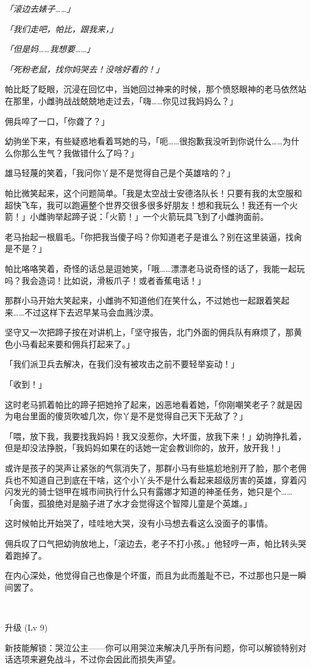 \emph{「滚边去婊子……」}

\emph{「我们走吧，帕比，跟我来，」}

\emph{「但是妈……我想要……」}

\emph{「死粉老鼠，找你妈哭去！没啥好看的！」}

帕比眨了眨眼，沉浸在回忆中，当她回过神来的时候，那个愤怒眼神的老马依然站在那里，小雌驹战战兢兢地走过去，「嗨……你见过我妈妈么？」

佣兵啐了一口，「你聋了？」

幼驹坐下来，有些疑惑地看着骂她的马，「呃……很抱歉我没听到你说什么……为什么你那么生气？我做错什么了吗？」

雄马轻蔑的笑着，「我问你丫是不是觉得自己是个英雄啥的？」

帕比微笑起来，这个问题简单。「我是太空战士安德洛队长！只要有我的太空服和超快飞车，我可以跑遍整个世界交很多很多好朋友！想和我玩么！我还有一个火箭！」小雌驹举起蹄子说：「火箭！」一个火箭玩具飞到了小雌驹面前。

老马抬起一根眉毛。「你把我当傻子吗？你知道老子是谁么？别在这里装逼，找肏是不是？」

帕比咯咯笑着，奇怪的话总是逗她笑，「哦……漂漂老马说奇怪的话了，我能一起玩吗？我会造词！比如说，滑板爪子！或者香蕉电话！」

那群小马开始大笑起来，小雌驹不知道他们在笑什么，不过她也一起跟着笑起来……不过这样下去迟早某马会血溅沙漠。

坚守又一次把蹄子按在对讲机上，「坚守报告，北门外面的佣兵队有麻烦了，那黄色小马看起来要和佣兵打起来了。」

「我们派卫兵去解决，在我们没有被攻击之前不要轻举妄动！」

「收到！」

这时老马抓着帕比的蹄子把她拎了起来，凶恶地看着她，「你刚嘲笑老子？就是因为电台里面的傻货吹嘘几次，你丫是不是觉得自己天下无敌了？」

「喂，放下我，我要找我妈妈！我又没惹你，大坏蛋，放我下来！」幼驹挣扎着，但是却没法挣脱，「我妈妈如果在的话她一定会教训你的，放开，放开我！」

或许是孩子的哭声让紧张的气氛消失了，那群小马有些尴尬地别开了脸，那个老佣兵也不知道自己到底在干啥，这个小丫头不是什么看起来超级厉害的英雄，穿着闪闪发光的骑士铠甲在城市间执行什么只有露娜才知道的神圣任务，她只是个……「肏蛋，孤狼绝对是脑子进了水才会觉得这个智障儿童是个英雄。」

这时候帕比开始哭了，哇哇地大哭，没有小马想去看这么没面子的事情。

佣兵叹了口气把幼驹放地上，「滚边去，老子不打小孩。」他轻哼一声，帕比转头哭着跑掉了。

在内心深处，他觉得自己也像是个坏蛋，而且为此而羞耻不已，不过那也只是一瞬间罢了。

~\vfill

\begin{note}
升级 (Lv 9) 

新技能解锁：哭泣公主——你可以用哭泣来解决几乎所有问题，你可以解锁特别对话选项来避免战斗，不过你会因此而损失声望。
\end{note}



